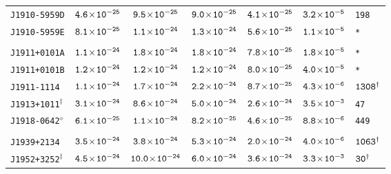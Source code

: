 \begin{longtable}{l | c | c | c | c | c | l}
\scriptsize{\tt{J1910-5959D}} & \scriptsize{$\tt{4.6\!\times\!10^{-25}}$} & \scriptsize{$\tt{9.5\!\times\!10^{-25}}$} & \scriptsize{$\tt{9.0\!\times\!10^{-25}}$} &\scriptsize{$\tt{4.1\!\times\!10^{-25}}$} & \scriptsize{$\tt{3.2\!\times\!10^{-5}}$} & \scriptsize{\tt{198}} \\[-16pt] 
\scriptsize{\tt{J1910-5959E}} & \scriptsize{$\tt{8.1\!\times\!10^{-25}}$} & \scriptsize{$\tt{1.1\!\times\!10^{-24}}$} & \scriptsize{$\tt{1.3\!\times\!10^{-24}}$} & \scriptsize{$\tt{5.6\!\times\!10^{-25}}$} & \scriptsize{$\tt{1.1\!\times\!10^{-5}}$} & \scriptsize{\tt{*}} \\[-16pt] 
\\[-20pt] 
\scriptsize{\tt{J1911+0101A}} & \scriptsize{$\tt{1.1\!\times\!10^{-24}}$} & \scriptsize{$\tt{1.8\!\times\!10^{-24}}$} & \scriptsize{$\tt{1.8\!\times\!10^{-24}}$} & \scriptsize{$\tt{7.8\!\times\!10^{-25}}$} & \scriptsize{$\tt{1.8\!\times\!10^{-5}}$} & \scriptsize{\tt{*}} \\[-16pt] 
\scriptsize{\tt{J1911+0101B}} & \scriptsize{$\tt{1.2\!\times\!10^{-24}}$} & \scriptsize{$\tt{1.2\!\times\!10^{-24}}$} & \scriptsize{$\tt{1.2\!\times\!10^{-24}}$} & \scriptsize{$\tt{8.0\!\times\!10^{-25}}$} & \scriptsize{$\tt{4.0\!\times\!10^{-5}}$} & \scriptsize{\tt{*}} \\[-16pt] 
\scriptsize{\tt{J1911-1114}} & \scriptsize{$\tt{1.1\!\times\!10^{-24}}$} & \scriptsize{$\tt{1.7\!\times\!10^{-24}}$} & \scriptsize{$\tt{2.2\!\times\!10^{-24}}$} & \scriptsize{$\tt{8.7\!\times\!10^{-25}}$} & \scriptsize{$\tt{4.3\!\times\!10^{-6}}$} & \scriptsize{$\tt{1308^{\dagger}}$} \\[-16pt] 
\scriptsize{\tt{J1913+1011}$^{\ddagger}$} & \scriptsize{$\tt{3.1\!\times\!10^{-24}}$} &
\scriptsize{$\tt{8.6\!\times\!10^{-24}}$} & \scriptsize{$\tt{5.0\!\times\!10^{-24}}$} &\scriptsize{$\tt{2.6\!\times\!10^{-24}}$} &
\scriptsize{$\tt{3.5\!\times\!10^{-3}}$} & \scriptsize{\tt{47}} \\[-16pt] 
\scriptsize{\tt{J1918-0642}$^{\diamond}$} & \scriptsize{$\tt{6.1\!\times\!10^{-25}}$} &
\scriptsize{$\tt{1.1\!\times\!10^{-24}}$} & \scriptsize{$\tt{8.2\!\times\!10^{-25}}$} &\scriptsize{$\tt{4.6\!\times\!10^{-25}}$} &
\scriptsize{$\tt{8.8\!\times\!10^{-6}}$} & \scriptsize{\tt{449}} \\[-16pt] 
\\[-20pt] 
\scriptsize{\tt{J1939+2134}} & \scriptsize{$\tt{3.5\!\times\!10^{-24}}$} & \scriptsize{$\tt{3.8\!\times\!10^{-24}}$} & \scriptsize{$\tt{5.3\!\times\!10^{-24}}$} & \scriptsize{$\tt{2.0\!\times\!10^{-24}}$} & \scriptsize{$\tt{4.0\!\times\!10^{-6}}$} & \scriptsize{$\tt{1063^{\dagger}}$} \\[-16pt] 
\scriptsize{\tt{J1952+3252}$^{\ddagger}$} & \scriptsize{$\tt{4.5\!\times\!10^{-24}}$} &
\scriptsize{$\tt{10.0\!\times\!10^{-24}}$} & \scriptsize{$\tt{6.0\!\times\!10^{-24}}$} & \scriptsize{$\tt{3.6\!\times\!10^{-24}}$}
& \scriptsize{$\tt{3.3\!\times\!10^{-3}}$} & \scriptsize{$\tt{30^{\dagger}}$} \\[-16pt] 

\end{longtable}

